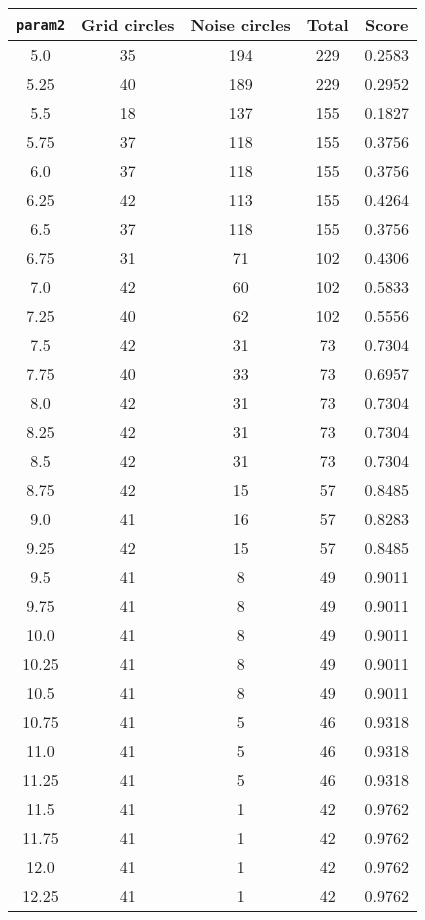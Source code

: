 \documentclass[letterpaper, 12pt]{article}
\begin{document}
\begin{longtable}{|c|c|c|c|c|}
\hline
\textbf{\texttt{param2}} & \textbf{Grid circles} & \textbf{Noise circles} & \textbf{Total} & \textbf{Score} \\
\hline
5.0 & 35 & 194 & 229 & 0.2583 \\
\hline
5.25 & 40 & 189 & 229 & 0.2952 \\
\hline
5.5 & 18 & 137 & 155 & 0.1827 \\
\hline
5.75 & 37 & 118 & 155 & 0.3756 \\
\hline
6.0 & 37 & 118 & 155 & 0.3756 \\
\hline
6.25 & 42 & 113 & 155 & 0.4264 \\
\hline
6.5 & 37 & 118 & 155 & 0.3756 \\
\hline
6.75 & 31 & 71 & 102 & 0.4306 \\
\hline
7.0 & 42 & 60 & 102 & 0.5833 \\
\hline
7.25 & 40 & 62 & 102 & 0.5556 \\
\hline
7.5 & 42 & 31 & 73 & 0.7304 \\
\hline
7.75 & 40 & 33 & 73 & 0.6957 \\
\hline
8.0 & 42 & 31 & 73 & 0.7304 \\
\hline
8.25 & 42 & 31 & 73 & 0.7304 \\
\hline
8.5 & 42 & 31 & 73 & 0.7304 \\
\hline
8.75 & 42 & 15 & 57 & 0.8485 \\
\hline
9.0 & 41 & 16 & 57 & 0.8283 \\
\hline
9.25 & 42 & 15 & 57 & 0.8485 \\
\hline
9.5 & 41 & 8 & 49 & 0.9011 \\
\hline
9.75 & 41 & 8 & 49 & 0.9011 \\
\hline
10.0 & 41 & 8 & 49 & 0.9011 \\
\hline
10.25 & 41 & 8 & 49 & 0.9011 \\
\hline
10.5 & 41 & 8 & 49 & 0.9011 \\
\hline
10.75 & 41 & 5 & 46 & 0.9318 \\
\hline
11.0 & 41 & 5 & 46 & 0.9318 \\
\hline
11.25 & 41 & 5 & 46 & 0.9318 \\
\hline
11.5 & 41 & 1 & 42 & 0.9762 \\
\hline
11.75 & 41 & 1 & 42 & 0.9762 \\
\hline
12.0 & 41 & 1 & 42 & 0.9762 \\
\hline
12.25 & 41 & 1 & 42 & 0.9762 \\
\hline

\end{longtable}
\end{document}
